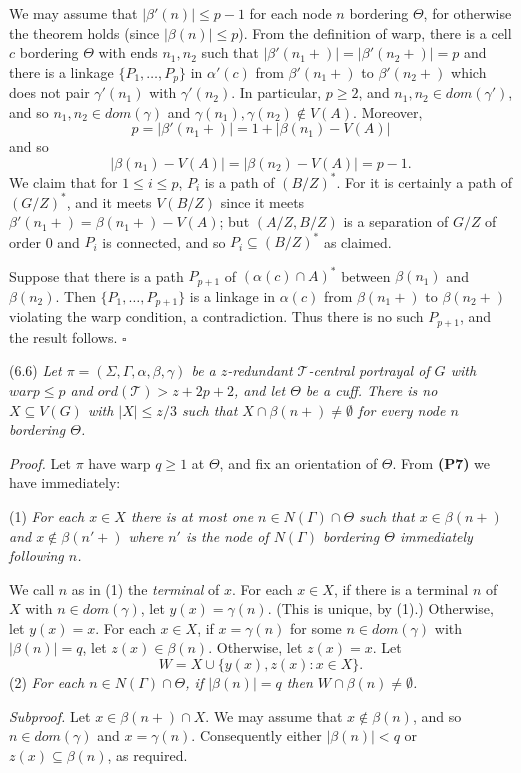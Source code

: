 We may assume that $|\beta'(n)| \le p - 1$ for each node $n$ bordering $\Theta$, for otherwise the theorem holds (since $|\beta(n)| \le p$). From the definition of warp, there is a cell $c$ bordering $\Theta$ with ends $n_1, n_2$ such that $|\beta'(n_1 +)| = |\beta'(n_2 +)| = p$ and there is a linkage $\{P_1, \dots, P_p\}$ in $\alpha'(c)$ from $\beta'(n_1 +)$ to $\beta'(n_2 +)$ which does not pair $\gamma'(n_1)$ with $\gamma'(n_2)$. In particular, $p \ge 2$, and $n_1, n_2 \in dom(\gamma')$, and so $n_1, n_2 \in dom(\gamma)$ and $\gamma(n_1), \gamma(n_2) \notin V(A)$. Moreover,
\begin{equation*}
p = |\beta'(n_1 +)| = 1 + |\beta(n_1) - V(A)|
\end{equation*}
and so
\begin{equation*}
|\beta(n_1) - V(A)| = |\beta(n_2) - V(A)| = p - 1.
\end{equation*}
We claim that for $1 \le i \le p$, $P_i$ is a path of $(B/Z)^*$. For it is certainly a path of $(G/Z)^*$, and it meets $V(B/Z)$ since it meets $\beta'(n_1 +) = \beta(n_1 +) - V(A)$; but $(A/Z, B/Z)$ is a separation of $G/Z$ of order 0 and $P_i$ is connected, and so $P_i \subseteq (B/Z)^*$ as claimed.

Suppose that there is a path $P_{p+1}$ of $(\alpha(c) \cap A)^*$ between $\beta(n_1)$ and $\beta(n_2)$. Then $\{P_1, \dots, P_{p+1}\}$ is a linkage in $\alpha(c)$ from $\beta(n_1 +)$ to $\beta(n_2 +)$ violating the warp condition, a contradiction. Thus there is no such $P_{p+1}$, and the result follows. $\square$

\stmt
(6.6) \textit{Let $\pi = (\Sigma, \Gamma, \alpha, \beta, \gamma)$ be a $z$-redundant $\mathscr{T}$-central portrayal of $G$ with $warp \le p$ and $ord(\mathscr{T}) > z + 2p + 2$, and let $\Theta$ be a cuff. There is no $X \subseteq V(G)$ with $|X| \le z/3$ such that $X \cap \beta(n+) \ne \emptyset$ for every node $n$ bordering $\Theta$.}

\textit{Proof.} Let $\pi$ have warp $q \ge 1$ at $\Theta$, and fix an orientation of $\Theta$. From \textbf{(P7)} we have immediately:

\hspace*{12pt}(1) \textit{For each $x \in X$ there is at most one $n \in N(\Gamma) \cap \Theta$ such that $x \in \beta(n+)$ and $x \notin \beta(n'+)$ where $n'$ is the node of $N(\Gamma)$ bordering $\Theta$ immediately following $n$.}

We call $n$ as in (1) the \textit{terminal} of $x$. For each $x \in X$, if there is a terminal $n$ of $X$ with $n \in dom(\gamma)$, let $y(x) = \gamma(n)$. (This is unique, by (1).) Otherwise, let $y(x) = x$. For each $x \in X$, if $x = \gamma(n)$ for some $n \in dom(\gamma)$ with $|\beta(n)| = q$, let $z(x) \in \beta(n)$. Otherwise, let $z(x) = x$. Let
\begin{equation*}
W = X \cup \{y(x), z(x) : x \in X\}.
\end{equation*}
\hspace*{12pt}(2) \textit{For each $n \in N(\Gamma) \cap \Theta$, if $|\beta(n)| = q$ then $W \cap \beta(n) \ne \emptyset$.}

\textit{Subproof.} Let $x \in \beta(n+) \cap X$. We may assume that $x \notin \beta(n)$, and so $n \in dom(\gamma)$ and $x = \gamma(n)$. Consequently either $|\beta(n)| < q$ or $z(x) \subseteq \beta(n)$, as required.

